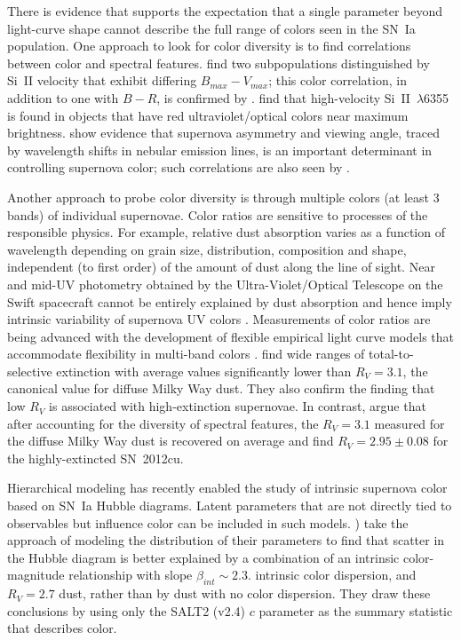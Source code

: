 \documentclass{aastex61}   	%
\begin{document}
There is evidence that supports the expectation that a single parameter beyond light-curve shape  cannot describe the full range
of colors seen in the SN~Ia population.  One approach to look for color diversity is to find correlations between color and spectral features.
\citet{2009ApJ...699L.139W, 2011ApJ...729...55F} find two subpopulations distinguished
by Si~II velocity that exhibit differing $B_{\mathit{\mathit{max}}}-V_{\mathit{max}}$; this color correlation, in addition to one with $B-R$, is confirmed by
\citet{2014ApJ...797...75M}.
\citet{2015MNRAS.451.1973S}
find that high-velocity Si~II~$\lambda$6355 is found in objects that have red ultraviolet/optical colors near maximum brightness.
\citet{2011MNRAS.413.3075M} show evidence that supernova asymmetry and viewing angle,
traced by wavelength shifts in nebular emission lines, is an important determinant in controlling supernova color; such correlations are also seen by \citet{2011A&A...534L..15C}.

Another approach to probe color diversity is through multiple colors (at least 3 bands)
of individual supernovae.  Color ratios are sensitive to processes of the responsible physics.   For example,
relative dust absorption varies as a function of wavelength depending on grain size, distribution, composition and shape,
independent (to first order) of the amount of dust along the line of sight.
Near and mid-UV photometry obtained by the Ultra-Violet/Optical Telescope on the Swift spacecraft cannot be entirely explained
by dust absorption and hence imply intrinsic variability of supernova UV colors
\citep{2017ApJ...836..232B}.
Measurements of color ratios are being advanced with the development of flexible empirical light curve models that accommodate flexibility in multi-band colors
\citep[e.g.][]{2011ApJ...731..120M}.
\citet{2014ApJ...789...32B, 2015MNRAS.453.3300A} find wide
ranges of total-to-selective extinction with average values significantly lower than $R_V = 3.1$,
the canonical value for diffuse Milky Way dust.
They also confirm the \citet{2011ApJ...731..120M, 2011ApJ...729...55F} finding that low $R_V$ is associated with high-extinction supernovae.
In contrast, \citet{2011A&A...529L...4C} argue that after accounting for the diversity of spectral features,
the $R_V=3.1$ measured for the diffuse Milky Way dust is recovered on average and \citet{2017ApJ...836..157H}
find $R_V=2.95 \pm 0.08$ for the highly-extincted SN~2012cu.

Hierarchical modeling has recently enabled
the study of intrinsic supernova color based on SN~Ia Hubble diagrams. Latent parameters that are not directly tied to observables
but  influence color can be included in such models.
\citet{2017ApJ...842...93M} ) take the approach of modeling the distribution of their parameters to find that
scatter in the Hubble diagram is better explained by a combination of 
an intrinsic color-magnitude relationship with slope $\beta_{\mathit{int}}\sim 2.3$. intrinsic
color dispersion,
and
$R_V=2.7$ dust, rather than by dust with no color dispersion.
They draw these conclusions by using only the SALT2 (v2.4)
 $c$
parameter as the summary statistic that describes color.
\end{document}
